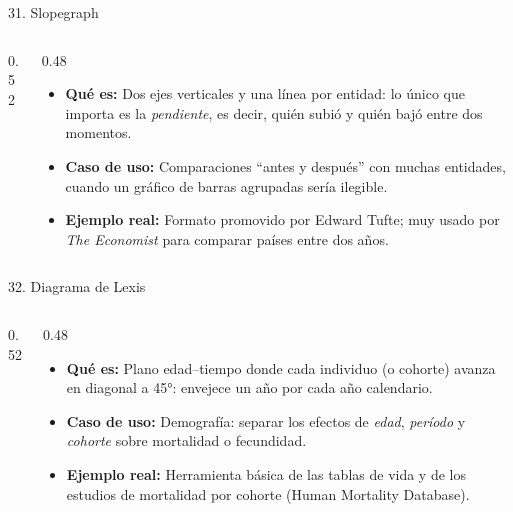 \documentclass[aspectratio=169,9pt]{beamer}
\newcommand{\ficha}[3]{%
\begin{itemize}
\item \textbf{Qué es:} #1
\item \textbf{Caso de uso:} #2
\item \textbf{Ejemplo real:} #3
\end{itemize}}
\begin{document}
\begin{frame}{31. Slopegraph}
\begin{columns}[T]
\begin{column}{0.52\textwidth}
\centering
{}
\end{column}
\begin{column}{0.48\textwidth}
\ficha{Dos ejes verticales y una línea por entidad: lo único que importa es la \emph{pendiente}, es decir, quién subió y quién bajó entre dos momentos.}
{Comparaciones ``antes y después'' con muchas entidades, cuando un gráfico de barras agrupadas sería ilegible.}
{Formato promovido por Edward Tufte; muy usado por \emph{The Economist} para comparar países entre dos años.}
\end{column}
\end{columns}
\end{frame}

\begin{frame}{32. Diagrama de Lexis}
\begin{columns}[T]
\begin{column}{0.52\textwidth}
\centering
{}
\end{column}
\begin{column}{0.48\textwidth}
\ficha{Plano edad--tiempo donde cada individuo (o cohorte) avanza en diagonal a 45°: envejece un año por cada año calendario.}
{Demografía: separar los efectos de \emph{edad}, \emph{período} y \emph{cohorte} sobre mortalidad o fecundidad.}
{Herramienta básica de las tablas de vida y de los estudios de mortalidad por cohorte (Human Mortality Database).}
\end{column}
\end{columns}
\end{frame}
\end{document}
